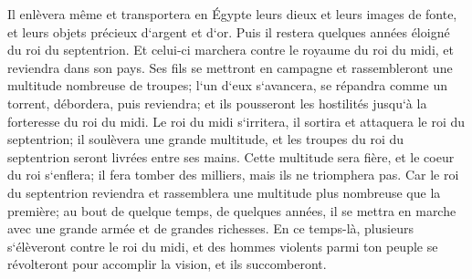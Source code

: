 \verse Il enlèvera même et transportera en Égypte leurs dieux et leurs images de fonte, et leurs objets précieux d`argent et d`or. Puis il restera quelques années éloigné du roi du septentrion. 
\verse Et celui-ci marchera contre le royaume du roi du midi, et reviendra dans son pays. 
\verse Ses fils se mettront en campagne et rassembleront une multitude nombreuse de troupes; l`un d`eux s`avancera, se répandra comme un torrent, débordera, puis reviendra; et ils pousseront les hostilités jusqu`à la forteresse du roi du midi. 
\verse Le roi du midi s`irritera, il sortira et attaquera le roi du septentrion; il soulèvera une grande multitude, et les troupes du roi du septentrion seront livrées entre ses mains. 
\verse Cette multitude sera fière, et le coeur du roi s`enflera; il fera tomber des milliers, mais ils ne triomphera pas. 
\verse Car le roi du septentrion reviendra et rassemblera une multitude plus nombreuse que la première; au bout de quelque temps, de quelques années, il se mettra en marche avec une grande armée et de grandes richesses. 
\verse En ce temps-là, plusieurs s`élèveront contre le roi du midi, et des hommes violents parmi ton peuple se révolteront pour accomplir la vision, et ils succomberont. 
